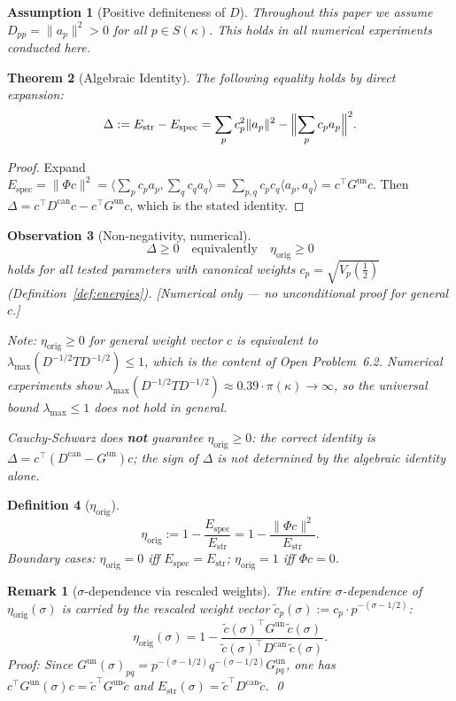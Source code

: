 \documentclass[11pt]{article}
\newtheorem{theorem}{Theorem}[section]
\newtheorem{definition}[theorem]{Definition}
\newtheorem{assumption}[theorem]{Assumption}
\newtheorem{observation}[theorem]{Observation}
\newtheorem*{remark}{Remark}
\newcommand{\Estr}{E_{\mathrm{str}}}
\newcommand{\Espec}{E_{\mathrm{spec}}}
\newcommand{\etaorig}{\eta_{\mathrm{orig}}}
\newcommand{\Gun}{G^{\mathrm{un}}}
\newcommand{\Dcan}{D^{\mathrm{can}}}
\begin{document}
\begin{assumption}[Positive definiteness of $D$]
Throughout this paper we assume $D_{pp}=\|a_p\|^2>0$ for all
$p\in S(\kappa)$. This holds in all numerical experiments conducted here.
\end{assumption}

\begin{theorem}[Algebraic Identity]
\label{thm:identity}
The following equality holds by direct expansion:
\[
\Delta:=\Estr-\Espec=\sum_p c_p^2\|a_p\|^2-\Bigl\|\sum_p c_p a_p\Bigr\|^2.
\]
\end{theorem}

\begin{proof}
Expand $\Espec=\|\Phi c\|^2=\bigl\langle\sum_p c_p a_p,\sum_q c_q
a_q\bigr\rangle=\sum_{p,q}c_p c_q\langle a_p,a_q\rangle=c^\top\Gun c$.
Then $\Delta=c^\top\Dcan c-c^\top\Gun c$, which is the stated identity.
\end{proof}

\begin{observation}[Non-negativity, numerical]
\label{obs:nonneg}
\[
\Delta\geq 0\quad\text{equivalently}\quad\etaorig\geq 0
\]
holds for all tested parameters with canonical weights
$c_p=\sqrt{V_p({\textstyle\frac12})}$ (Definition~\ref{def:energies}). %
\emph{[Numerical only --- no unconditional proof for general $c$.]}

Note: $\etaorig\geq 0$ for general weight vector $c$ is equivalent to
$\lambda_{\max}(D^{-1/2}TD^{-1/2})\leq 1$, which is the content of
Open Problem~6.2. Numerical experiments show
$\lambda_{\max}(D^{-1/2}TD^{-1/2})\approx 0.39\cdot\pi(\kappa)\to\infty$,
so the universal bound $\lambda_{\max}\leq 1$ does not hold in general.

\emph{Cauchy-Schwarz does \textbf{not} guarantee $\etaorig\geq 0$}: the
correct identity is $\Delta=c^\top(\Dcan-\Gun)c$; the sign of $\Delta$ is not
determined by the algebraic identity alone.
\end{observation}

\begin{definition}[$\etaorig$]
\label{def:eta}
\[
\etaorig:=1-\frac{\Espec}{\Estr}=1-\frac{\|\Phi c\|^2}{\Estr}.
\]
Boundary cases: $\etaorig=0$ iff $\Espec=\Estr$; $\etaorig=1$ iff $\Phi c=0$.
\end{definition}

\begin{remark}[$\sigma$-dependence via rescaled weights]
The entire $\sigma$-dependence of $\etaorig(\sigma)$ is carried by the
rescaled weight vector $\tilde{c}_p(\sigma):=c_p\cdot p^{-(\sigma-1/2)}$:
\[
\etaorig(\sigma)=1-\frac{\tilde{c}(\sigma)^\top\Gun\,\tilde{c}(\sigma)}
{\tilde{c}(\sigma)^\top\Dcan\,\tilde{c}(\sigma)}.
\]
\emph{Proof:} Since $\Gun(\sigma)_{pq}=p^{-(\sigma-1/2)}q^{-(\sigma-1/2)}\Gun_{pq}$,
one has $c^\top\Gun(\sigma)c=\tilde{c}^\top\Gun\tilde{c}$ and
$\Estr(\sigma)=\tilde{c}^\top\Dcan\tilde{c}$. \qed
\end{remark}
\end{document}

